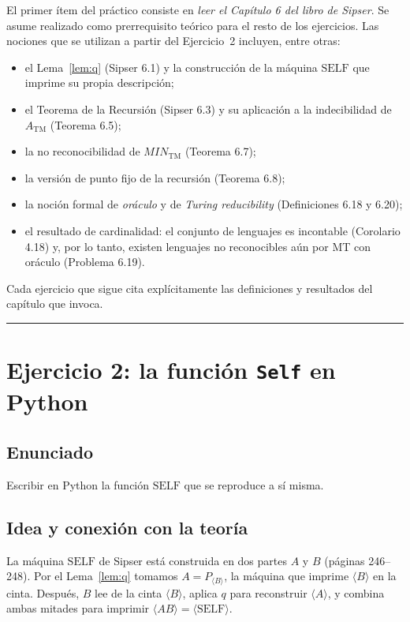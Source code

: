 \documentclass[11pt,a4paper]{article}
\theoremstyle{plain}
\theoremstyle{definition}
\theoremstyle{remark}
\newcommand{\TM}{\mathrm{TM}}
\newcommand{\enc}[1]{\langle #1\rangle}
\newcommand{\ATM}{A_{\TM}}
\newcommand{\MIN}{\mathit{MIN}_{\TM}}
\newcommand{\SELF}{\mathrm{SELF}}
\newcommand{\Pw}[1]{P_{#1}}
\begin{document}
El primer \'item del pr\'actico consiste en \emph{leer el Cap\'itulo 6 del
libro de Sipser}. Se asume realizado como prerrequisito te\'orico para el
resto de los ejercicios. Las nociones que se utilizan a partir del
Ejercicio~2 incluyen, entre otras:
\begin{itemize}
  \item el Lema~\ref{lem:q} (Sipser 6.1) y la construcci\'on de la m\'aquina
        $\SELF$ que imprime su propia descripci\'on;
  \item el Teorema de la Recursi\'on (Sipser 6.3) y su aplicaci\'on a la
        indecibilidad de $\ATM$ (Teorema 6.5);
  \item la no reconocibilidad de $\MIN$ (Teorema 6.7);
  \item la versi\'on de punto fijo de la recursi\'on (Teorema 6.8);
  \item la noci\'on formal de \emph{or\'aculo} y de \emph{Turing reducibility}
        (Definiciones 6.18 y 6.20);
  \item el resultado de cardinalidad: el conjunto de lenguajes es incontable
        (Corolario 4.18) y, por lo tanto, existen lenguajes no reconocibles
        a\'un por MT con or\'aculo (Problema 6.19).
\end{itemize}
Cada ejercicio que sigue cita expl\'icitamente las definiciones y resultados
del cap\'itulo que invoca.

\bigskip\hrule\bigskip

\section{Ejercicio 2: la funci\'on \texttt{Self} en Python}
\label{sec:ej2}

\subsection*{Enunciado}

Escribir en Python la funci\'on $\SELF$ que se reproduce a s\'i misma.

\subsection*{Idea y conexi\'on con la teor\'ia}

La m\'aquina $\SELF$ de Sipser est\'a construida en dos partes $A$ y $B$
(p\'aginas 246--248). Por el Lema~\ref{lem:q} tomamos $A = \Pw{\enc{B}}$, la
m\'aquina que imprime $\enc{B}$ en la cinta. Despu\'es, $B$ lee de la cinta
$\enc{B}$, aplica $q$ para reconstruir $\enc{A}$, y combina ambas mitades para
imprimir $\enc{AB}=\enc{\SELF}$.
\end{document}
